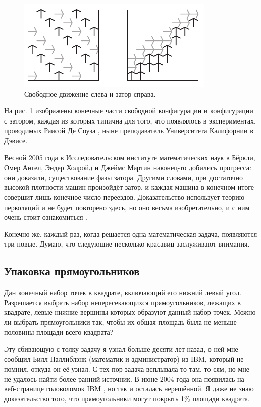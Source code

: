\begin{figure}[htb!]
\centering
\includegraphics[scale=1]{pics/gridlock}
\caption{Свободное движение слева и затор справа.}
\label{pic:gridlock}
\end{figure}

На рис. \ref{pic:gridlock} изображены конечные части свободной конфигурации и конфигурации с затором, каждая из которых типична для того, что появлялось в экспериментах, проводимых Раисой Де Соуза \cite{15}, ныне преподаватель Университета Калифорнии в Дэвисе.

Весной 2005 года в Исследовательском институте математических наук в Бёркли, Омер Ангел, Эндер Холройд и Джеймс Мартин наконец-то добились прогресса: они доказали, существование фазы затора.
Другими словами, при достаточно высокой плотности машин произойдёт затор, и каждая машина в конечном итоге совершит лишь конечное число переездов.
Доказательство использует теорию перколяций и не будет повторено здесь, но оно весьма изобретательно, и с ним очень стоит ознакомиться \cite{2}.

Конечно же, каждый раз, когда решается одна математическая задача, появляются три новые.
Думаю, что следующие несколько красавиц заслуживают внимания.

\subsection*{Упаковка прямоугольников}

Дан конечный набор точек в квадрате, включающий его нижний левый угол.
Разрешается выбрать набор непересекающихся прямоугольников, лежащих в квадрате, левые нижние вершины которых образуют данный набор точек.
Можно ли выбрать прямоугольники так, чтобы их общая площадь была не меньше половины площади всего квадрата?

\medskip

Эту сбивающую с толку задачу я узнал больше десяти лет назад,
о ней мне сообщил Билл Паллиблэнк (математик и администратор) из IBM, который не помнил, откуда он её узнал.
С тех пор задача всплывала то там, то сям, но мне не удалось найти более ранний источник.
В июне 2004 года она появилась на веб-странице головоломок IBM \cite{ponder-this}, но так и осталась нерешённой.
Я даже не знаю доказательство того, что прямоугольники могут покрыть 1\% площади квадрата.

